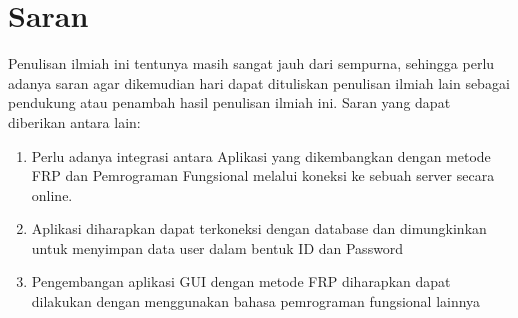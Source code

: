 \documentclass[pi.tex]{subfile}
\begin{document}
\section{Saran}
Penulisan ilmiah ini tentunya masih sangat jauh dari sempurna, sehingga perlu adanya saran agar dikemudian hari dapat dituliskan penulisan ilmiah lain sebagai pendukung atau penambah hasil penulisan ilmiah ini. Saran yang dapat diberikan antara lain:
\begin{enumerate}
  \item Perlu adanya integrasi antara Aplikasi yang dikembangkan dengan metode FRP dan Pemrograman Fungsional melalui koneksi ke sebuah server secara online.
  \item Aplikasi diharapkan dapat terkoneksi dengan database dan dimungkinkan untuk menyimpan data user dalam bentuk ID dan Password
  \item Pengembangan aplikasi GUI dengan metode FRP diharapkan dapat dilakukan dengan menggunakan bahasa pemrograman fungsional lainnya
\end{enumerate}
\end{document}
